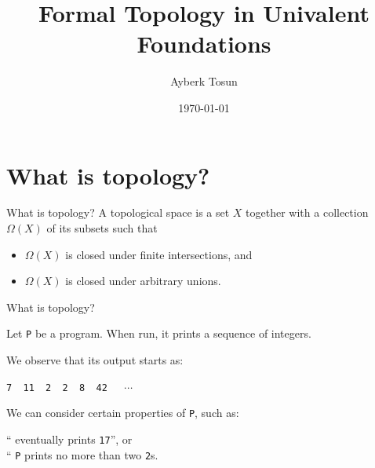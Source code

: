 \documentclass[xcolor={dvipsnames}]{beamer}
\title{Formal Topology in Univalent Foundations}
\date{\today}
\author{Ayberk Tosun}
\institute{Chalmers University of Technology}
\newcommand{\fnname}[1]{{\color{codecolour} {\tt #1}}}
\newcommand{\prgoutput}[1]{{\color{codecolour} {\tt #1}}}
\begin{document}
\maketitle

\section{What is topology?}

\begin{frame}{What is topology?}
  \large
  A topological space is a set $X$ together with a collection $\Omega(X)$ of its subsets
  such that
  \begin{itemize}
    \item $\Omega(X)$ is closed under \alert{finite} intersections, and
    \item $\Omega(X)$ is closed under \alert{arbitrary} unions.
  \end{itemize}
\end{frame}

\begin{frame}[c]{What is topology?}
  \large
  \vspace{2em}

  Let \fnname{P} be a program. When run, it prints a sequence of integers.

  \vspace{1em}

  We \alert{observe} that its output starts as:

  \begin{center}
  \prgoutput{7~~11~~2~~2~~8~~42~~}~$\cdots$
  \end{center}

  We can consider certain properties of \fnname{P}, such as:
  \begin{center}
    ``\tikzmarknode{a}{\fnname{P}} eventually prints \fnname{17}'', or\\
    \vspace{1em}
    ``\fnname{P} prints no more than two \fnname{2}s.
  \end{center}

\end{frame}
\end{document}

